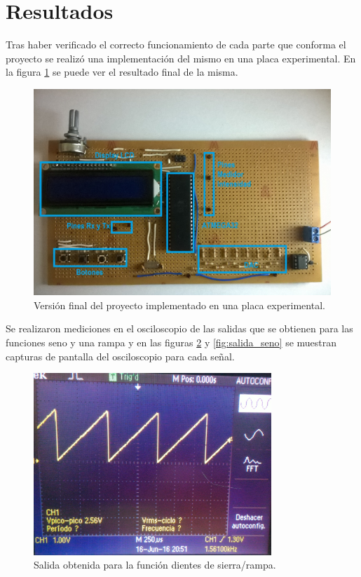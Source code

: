 \section{Resultados}
\label{sec:resultados}

Tras haber verificado el correcto funcionamiento de cada parte que conforma el proyecto se realizó una implementación del mismo en una placa experimental. En la figura \ref{fig:placa} se puede ver el resultado final de la misma.

\begin{figure}[H]
  \centering
  \includegraphics[width=1.0\textwidth]{images/placa.jpg}
  \caption{Versión final del proyecto implementado en una placa experimental.}
  \label{fig:placa}
\end{figure}

Se realizaron mediciones en el osciloscopio de las salidas que se obtienen para las funciones seno y una rampa y en las figuras \ref{fig:salida_rampa} y \ref{fig:salida_seno} se muestran capturas de pantalla del osciloscopio para cada señal.

\begin{figure}[H]
  \centering
  \includegraphics[width=0.8\textwidth]{images/resultados_rampa_precargadav2.jpg}
  \caption{Salida obtenida para la función dientes de sierra/rampa.}
  \label{fig:salida_rampa}
\end{figure}

